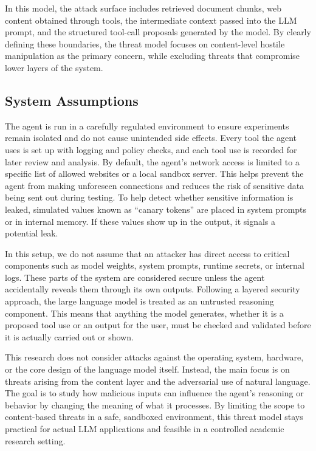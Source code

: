\documentclass[11pt]{article}
\begin{document}
In this model, the attack surface includes retrieved document chunks, web content obtained through tools, the intermediate context passed into the LLM prompt, and the structured tool-call proposals generated by the model. By clearly defining these boundaries, the threat model focuses on content-level hostile manipulation as the primary concern, while excluding threats that compromise lower layers of the system.

\subsection{System Assumptions}
The agent is run in a carefully regulated environment to ensure experiments remain isolated and do not cause unintended side effects. Every tool the agent uses is set up with logging and policy checks, and each tool use is recorded for later review and analysis. By default, the agent's network access is limited to a specific list of allowed websites or a local sandbox server. This helps prevent the agent from making unforeseen connections and reduces the risk of sensitive data being sent out during testing. To help detect whether sensitive information is leaked, simulated values known as ``canary tokens'' are placed in system prompts or in internal memory. If these values show up in the output, it signals a potential leak.

In this setup, we do not assume that an attacker has direct access to critical components such as model weights, system prompts, runtime secrets, or internal logs. These parts of the system are considered secure unless the agent accidentally reveals them through its own outputs. Following a layered security approach, the large language model is treated as an untrusted reasoning component. This means that anything the model generates, whether it is a proposed tool use or an output for the user, must be checked and validated before it is actually carried out or shown.

This research does not consider attacks against the operating system, hardware, or the core design of the language model itself. Instead, the main focus is on threats arising from the content layer and the adversarial use of natural language. The goal is to study how malicious inputs can influence the agent's reasoning or behavior by changing the meaning of what it processes. By limiting the scope to content-based threats in a safe, sandboxed environment, this threat model stays practical for actual LLM applications and feasible in a controlled academic research setting.
\end{document}
